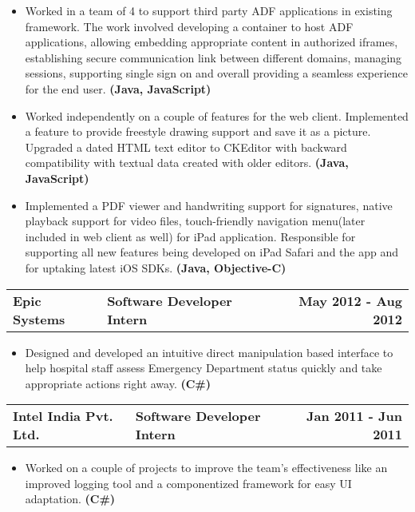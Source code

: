 \documentclass[a4paper]{article}
\makeatletter
\newcommand{\experiencesubsection}[3]{
	\begin{tabular*}{1.0\textwidth}{@{\extracolsep{\fill}} p{7cm} l r}
		\textbf{#1} & \textbf{#2} & \textbf{#3}
	\end{tabular*}
} %
\newcommand{\techitem}[1]{\item Technology: \textbf{#1}} %
\newcommand{\project}[3]{\item \textbf{#1}#2 \textbf{(#3)}} %
\newcommand{\customitemizespacing}{\addtolength{\itemsep}{-0.5\baselineskip}}
\makeatother
\begin{document}
\begin{itemize}
	\project{} {Worked in a team of 4 to support third party ADF applications in existing framework. The work involved developing a container to host ADF applications, allowing embedding appropriate content in authorized iframes, establishing secure communication link between different domains, managing sessions, supporting single sign on and overall providing a seamless experience for the end user.}{Java, JavaScript}
	\project{} {Worked independently on a couple of features for the web client. Implemented a feature to provide freestyle drawing support and save it as a picture. Upgraded a dated HTML text editor to CKEditor with backward compatibility with textual data created with older editors.}{Java, JavaScript}
	\project{} {Implemented a PDF viewer and handwriting support for signatures, native playback support for video files, touch-friendly navigation menu(later included in web client as well) for iPad application. Responsible for supporting all new features being developed on iPad Safari and the app and for uptaking latest iOS SDKs.}{Java, Objective-C}
\end{itemize}

\experiencesubsection{Epic Systems}{Software Developer Intern}{May 2012 - Aug 2012}
\begin{itemize}
	\project{}{Designed and developed an intuitive direct manipulation based interface to help hospital staff assess Emergency Department status quickly and take appropriate actions right away.}{C\#}
\end{itemize}

\experiencesubsection{Intel India Pvt. Ltd.}{Software Developer Intern}{Jan 2011 - Jun 2011}
\begin{itemize}
	\project{}{Worked on a couple of projects to improve the team's effectiveness like an improved logging tool and a componentized framework for easy UI adaptation.}{C\#}
\end{itemize}
\end{document}
